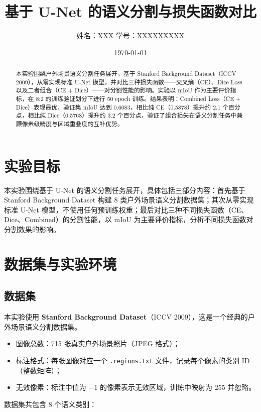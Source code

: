 \documentclass[UTF8,a4paper,12pt,fontset=fandol]{ctexart}
\title{基于 U-Net 的语义分割与损失函数对比}
\author{姓名：XXX \quad 学号：XXXXXXXXX}
\date{\today}
\begin{document}
\maketitle

\begin{abstract}
本实验围绕户外场景语义分割任务展开，基于 Stanford Background Dataset（ICCV 2009），从零实现标准 U-Net 模型，并对比三种损失函数——交叉熵（CE）、Dice Loss 以及二者组合（CE + Dice）——对分割性能的影响。实验以 mIoU 作为主要评价指标，在 8:2 的训练验证划分下进行 50 epoch 训练。结果表明：Combined Loss（CE + Dice）表现最优，验证集 mIoU 达到 0.6083，相比纯 CE（0.5878）提升约 2.1 个百分点，相比纯 Dice（0.5768）提升约 3.2 个百分点，验证了组合损失在语义分割任务中兼顾像素级精度与区域重叠度的互补优势。
\end{abstract}

\section{实验目标}
本实验围绕基于 U-Net 的语义分割任务展开，具体包括三部分内容：首先基于 Stanford Background Dataset 构建 8 类户外场景语义分割数据集；其次从零实现标准 U-Net 模型，不使用任何预训练权重；最后对比三种不同损失函数（CE、Dice、Combined）的分割性能，以 mIoU 为主要评价指标，分析不同损失函数对分割效果的影响。

\section{数据集与实验环境}

\subsection{数据集}
本实验使用 \textbf{Stanford Background Dataset}（ICCV 2009），这是一个经典的户外场景语义分割数据集。

\begin{itemize}
    \item 图像总数：715 张真实户外场景照片（JPEG 格式）；
    \item 标注格式：每张图像对应一个 \texttt{.regions.txt} 文件，记录每个像素的类别 ID（整数矩阵）；
    \item 无效像素：标注中值为 $-1$ 的像素表示无效区域，训练中映射为 $255$ 并忽略。
\end{itemize}

数据集共包含 8 个语义类别：
\end{document}
